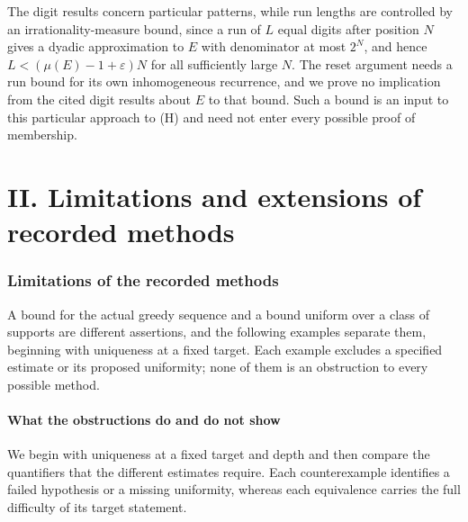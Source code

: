 \documentclass[11pt]{article}
\theoremstyle{plain}
\theoremstyle{definition}
\theoremstyle{remark}
\begin{document}
The digit results concern particular patterns, while run lengths are
controlled by an irrationality-measure bound, since a run of $L$ equal
digits after position $N$ gives a dyadic approximation to $E$ with
denominator at most $2^N$, and hence $L<(\mu(E)-1+\varepsilon)N$ for all
sufficiently large $N$. The reset argument needs a run bound for its own
inhomogeneous recurrence, and we prove no implication from the cited
digit results about $E$ to that bound. Such a bound is an input to this
particular approach to (H) and need not enter every possible proof of
membership.

\clearpage
\part*{II. Limitations and extensions of recorded methods}
\section{Limitations of the recorded methods}
\label{sec:257-wall}
A bound for the actual greedy sequence and a bound uniform over a class
of supports are different assertions, and the following examples
separate them, beginning with uniqueness at a fixed target. Each example
excludes a specified estimate or its proposed uniformity; none of them
is an obstruction to every possible method.


\subsection{What the obstructions do and do not show}

We begin with uniqueness at a fixed target and depth and then compare
the quantifiers that the different estimates require. Each
counterexample identifies a failed hypothesis or a missing uniformity,
whereas each equivalence carries the full difficulty of its target
statement.
\end{document}

